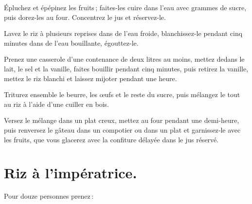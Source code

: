 Épluchez et épépinez les fruits ; faites-les cuire dans l'eau avec
{\mmm} grammes de sucre, puis dorez-les au four. Concentrez le jus et
réservez-le.

Lavez le riz à plusieurs reprises dans de l'eau froide, blanchissez-le pendant
cinq minutes dans de l’eau bouillante, égouttez-le.

Prenez une casserole d'une contenance de deux litres au moins, mettez dedans le
lait, le sel et la vanille, faites bouillir pendant cinq minutes, puis retirez
la vanille, mettez le riz blanchi et laissez mijoter pendant une heure.

Triturez ensemble le beurre, les œufs et le reste du sucre, puis mélangez le
tout au riz à l'aide d'une cuiller en bois.

Versez le mélange dans un plat creux, mettez au four pendant une demi-heure,
puis renversez le gâteau dans un compotier ou dans un plat et garnissez‑le avec
les fruits, que vous glacerez avec la confiture délayée dans le jus réservé.

\section*{\centering Riz à l'impératrice.}
{}

Pour douze personnes prenez :


